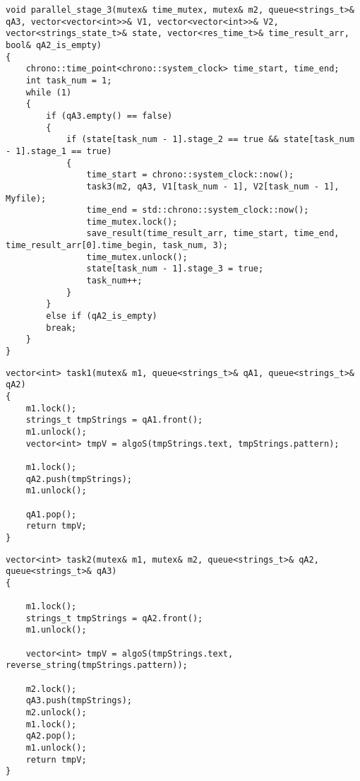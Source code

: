 \begin{center}
\captionsetup{justification=raggedright,singlelinecheck=off}
\begin{lstlisting}[label=lst:parallel_stage_3,caption=Функция 3-ей ленты конвейерной обработки строки]
void parallel_stage_3(mutex& time_mutex, mutex& m2, queue<strings_t>& qA3, vector<vector<int>>& V1, vector<vector<int>>& V2, vector<strings_state_t>& state, vector<res_time_t>& time_result_arr, bool& qA2_is_empty)
{
	chrono::time_point<chrono::system_clock> time_start, time_end;
	int task_num = 1;
	while (1)
	{
		if (qA3.empty() == false)
		{
			if (state[task_num - 1].stage_2 == true && state[task_num - 1].stage_1 == true)
			{
				time_start = chrono::system_clock::now();
				task3(m2, qA3, V1[task_num - 1], V2[task_num - 1], Myfile);
				time_end = std::chrono::system_clock::now();
				time_mutex.lock();
				save_result(time_result_arr, time_start, time_end, time_result_arr[0].time_begin, task_num, 3);
				time_mutex.unlock();
				state[task_num - 1].stage_3 = true;
				task_num++;
			}
		}
		else if (qA2_is_empty)
		break;
	}
}

\end{lstlisting}
\end{center}

\clearpage

\begin{center}
\captionsetup{justification=raggedright,singlelinecheck=off}
\begin{lstlisting}[label=lst:stage_1,caption=Функция реализации 1-ого этапа обработки строки]
vector<int> task1(mutex& m1, queue<strings_t>& qA1, queue<strings_t>& qA2)
{
	m1.lock();
	strings_t tmpStrings = qA1.front();
	m1.unlock();
	vector<int> tmpV = algoS(tmpStrings.text, tmpStrings.pattern);
	
	m1.lock();
	qA2.push(tmpStrings);
	m1.unlock();
	
	qA1.pop();
	return tmpV;
}
\end{lstlisting}
\end{center}

\begin{center}
\captionsetup{justification=raggedright,singlelinecheck=off}
\begin{lstlisting}[label=lst:stage_2,caption=Функция реализации 2-ого этапа обработки строки]
vector<int> task2(mutex& m1, mutex& m2, queue<strings_t>& qA2, queue<strings_t>& qA3)
{
	
	m1.lock();
	strings_t tmpStrings = qA2.front();
	m1.unlock();
	
	vector<int> tmpV = algoS(tmpStrings.text, reverse_string(tmpStrings.pattern));
	
	m2.lock();
	qA3.push(tmpStrings);
	m2.unlock();
	m1.lock();
	qA2.pop();
	m1.unlock();
	return tmpV;
}
\end{lstlisting}
\end{center}

